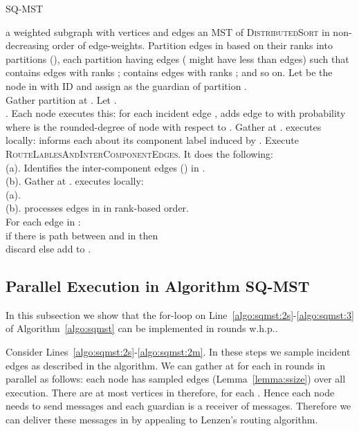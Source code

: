\documentclass[11pt]{article}
\newcommand{\lra}{Lenzen's routing algorithm}
\begin{document}
\begin{algorithm}[t]
  \caption{\textsc{SQ-MST} \label{algo:sqmst}}
  \begin{algorithmic}[1]
    \REQUIRE a weighted subgraph  with  vertices and  edges
    \ENSURE  an MST of 
    \STATE    \textsc{DistributedSort} in non-decreasing order of edge-weights. 
    \STATE   Partition edges in  based on their ranks  into  partitions  (),
	     each partition having  edges ( might have less than  edges) such that 
	      contains edges with ranks ;  contains edges with ranks ; and so on.
    \STATE   Let  be the node in  with ID  and
	     assign  as the guardian of partition . \\
	     Gather partition  at .
        \STATE Let .\label{algo:sqmst:2s} \\ 
	       .
	\STATE Each node  executes this: for each incident edge , 
	       adds edge  to  with probability  where
	        is the rounded-degree of node  with respect to . 
	\STATE Gather  at .
	\STATE  executes locally: 
	\STATE  informs each  about its component label  induced by . \label{algo:sqmst:2m}  
	\STATE Execute \textsc{RouteLablesAndInterComponentEdges}. It does the following: \\
	       (a). Identifies the inter-component edges ()  in . \\
	       (b). Gather  at .  \label{algo:sqmst:2e}
	\STATE  executes locally: \\ \label{algo:sqmst:3}
	       (a).  \\ 
	       (b).  processes edges in  in rank-based order. \\
		    For each edge  in  : \\
		    if there is path between  and  in  then \\
		    discard  else add  to .  
    \ENDFOR
    \RETURN  
  \end{algorithmic} 
\end{algorithm}

\subsection{Parallel Execution in Algorithm \textsc{SQ-MST}}
In this subsection we show that the for-loop on Line~\ref{algo:sqmst:2s}-\ref{algo:sqmst:3} of Algorithm~\ref{algo:sqmst} can be implemented in  rounds w.h.p..

Consider Lines~\ref{algo:sqmst:2s}-\ref{algo:sqmst:2m}. 
In these steps we sample incident edges as described in the algorithm.
We can gather  at  for each  in  rounds in parallel as follows: 
each node has  sampled edges (Lemma~\ref{lemma:ssize}) over all  execution. 
There are at most  vertices in  therefore,  for each . 
Hence each node needs to send  messages and each guardian is a receiver of  messages.
Therefore we can deliver these messages in  by appealing to \lra. 
\end{document}
